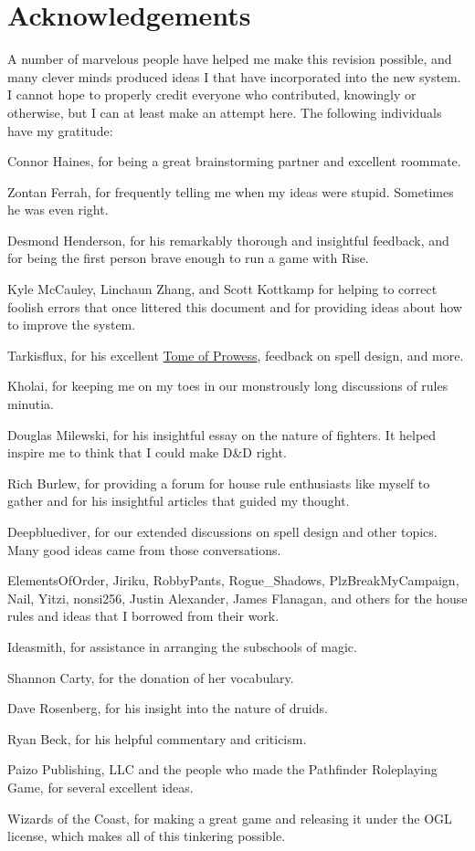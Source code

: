\chapter*{Acknowledgements}
A number of marvelous people have helped me make this revision possible, and many clever minds produced ideas I that have incorporated into the new system. I cannot hope to properly credit everyone who contributed, knowingly or otherwise, but I can at least make an attempt here. The following individuals have my gratitude:

Connor Haines, for being a great brainstorming partner and excellent roommate.

Zontan Ferrah, for frequently telling me when my ideas were stupid. Sometimes he was even right.

Desmond Henderson, for his remarkably thorough and insightful feedback, and for being the first person brave enough to run a game with Rise.

Kyle McCauley, Linchaun Zhang, and Scott Kottkamp for helping to correct foolish errors that once littered this document and for providing ideas about how to improve the system.

Tarkisflux, for his excellent \href{http://dnd-wiki.org/wiki/Tome_of_Prowess_(3.5e_Sourcebook)}{Tome of Prowess}, feedback on spell design, and more.

Kholai, for keeping me on my toes in our monstrously long discussions of rules minutia.

Douglas Milewski, for his insightful essay on the nature of fighters. It helped inspire me to think that I could make D\&D right.

Rich Burlew, for providing a forum for house rule enthusiasts like myself to gather and for his insightful articles that guided my thought.

Deepbluediver, for our extended discussions on spell design and other topics. Many good ideas came from those conversations.

ElementsOfOrder, Jiriku, RobbyPants, Rogue\_Shadows, PlzBreakMyCampaign, Nail, Yitzi, nonsi256, Justin Alexander, James Flanagan, and others for the house rules and ideas that I borrowed from their work.

Ideasmith, for assistance in arranging the subschools of magic.

Shannon Carty, for the donation of her vocabulary.

Dave Rosenberg, for his insight into the nature of druids.

Ryan Beck, for his helpful commentary and criticism.

Paizo Publishing, LLC and the people who made the Pathfinder Roleplaying Game, for several excellent ideas.

Wizards of the Coast, for making a great game and releasing it under the OGL license, which makes all of this tinkering possible.
